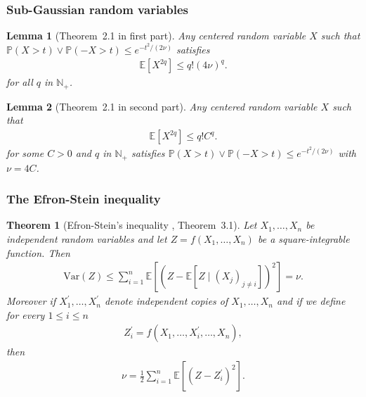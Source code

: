 \documentclass[twoside,11pt]{article}
\numberwithin{equation}{section}
\newtheorem{lem}{Lemma}[section]
\newcommand{\prob}[1]{\mathbb{P}\left(#1 \right)}
\newcommand{\esp}[1]{\mathbb{E}\left[#1 \right]}
\newcommand{\1}{\mathds{1}}%
\newcommand{\paren}[1]{\left( #1 \right)}
\newcommand{\Var}{\mathrm{Var}}
\numberwithin{equation}{section}
\theoremstyle{plain}
\newtheorem{thm}{Theorem}[section]
\begin{document}
\subsubsection{Sub-Gaussian random variables}

\begin{lem}[Theorem~2.1 in \cite{BouLugMas_2013} first part] \label{lem.subgaussian.exp.to.moment}
Any centered random variable $X$ such that $\prob{ X > t } \vee \prob{ -X > t } \leq e^{- t^2/(2\nu)}$ satisfies
\begin{align*}
  \esp{ X^{2q} } \leq q! \paren{ 4 \nu }^q.
\end{align*}
for all  $q$ in $\mathbb{N}_+$.
\end{lem}


\begin{lem}[Theorem~2.1 in \cite{BouLugMas_2013} second part] \label{lem.subgaussian.moment.to.exp}
Any centered random variable $X$ such that
\begin{align*}
  \esp{ X^{2q} } \leq q! C^q.
\end{align*}
for some $C>0$ and $q$ in $\mathbb{N}_+$ satisfies
 $\prob{ X > t } \vee \prob{ -X > t } \leq e^{- t^2/(2\nu)}$ with $\nu = 4C$.
\end{lem}




\subsubsection{The Efron-Stein inequality}

\begin{thm}[Efron-Stein's inequality \cite{BouLugMas_2013}, Theorem~3.1]
\label{thm.efron.stein}
%
Let $X_1,\ldots,X_n$ be independent random variables and let $Z = f\paren{X_1,\ldots,X_n}$ be a square-integrable function.
%
Then
\begin{align*}
  \Var(Z) \leq \sum_{i=1}^n \esp{ \paren{Z - \esp{ Z \mid (X_j)_{j\neq i}} }^2 } = \nu.
\end{align*}
%
Moreover if $X_1^{\prime},\ldots,X_n^{\prime}$ denote independent copies of $X_1,\ldots,X_n$ and if we define for every $1\leq i\leq n$
\begin{align*}
  Z_i^{\prime} = f\paren{X_1,\ldots,X_i^{\prime},\ldots,X_n},
\end{align*}
then
\begin{align*}
  \nu = \frac{1}{2} \sum_{i=1}^n \esp{ \paren{Z - Z_i^{\prime}}^2 }.
\end{align*}
\end{thm}
\end{document}
